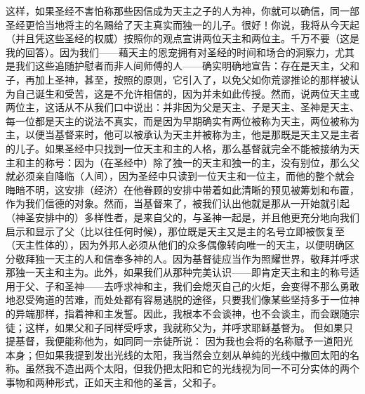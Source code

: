 这样，如果圣经不害怕称那些因信成为天主之子的人为神，你就可以确信，同一部圣经更恰当地将主的名赐给了天主真实而独一的儿子。很好！你说，我将从今天起（并且凭这些圣经的权威）按照你的观点宣讲两位天主和两位主。千万不要（这是我的回答）。因为我们——藉天主的恩宠拥有对圣经的时间和场合的洞察力，尤其是我们这些追随护慰者而非人间师傅的人——确实明确地宣告：存在是天主，父和子，再加上圣神，甚至，按照的原则，它引入了，以免父如你荒谬推论的那样被认为自己诞生和受苦，这是不允许相信的，因为并未如此传授。然而，说两位天主或两位主，这话从不从我们口中说出：并非因为父是天主、子是天主、圣神是天主、每一位都是天主的说法不真实，而是因为早期确实有两位被称为天主，两位被称为主，以便当基督来时，他可以被承认为天主并被称为主，他是那既是天主又是主者的儿子。如果圣经中只找到一位天主和主的人格，那么基督就完全不能被接纳为天主和主的称号：因为（在圣经中）除了独一的天主和独一的主，没有别位，那么父就必须亲自降临（人间），因为圣经中只读到一位天主和一位主，而他的整个就会晦暗不明，这安排（经济）在他眷顾的安排中带着如此清晰的预见被筹划和布置，作为我们信德的对象。然而，当基督来了，被我们认出他就是那从一开始就引起（神圣安排中的）多样性者，是来自父的，与圣神一起是，并且他更充分地向我们启示和显示了父（比以往任何时候），那位既是天主又是主的名号立即被恢复至（天主性体的），因为外邦人必须从他们的众多偶像转向唯一的天主，以便明确区分敬拜独一天主的人和信奉多神的人。因为基督徒应当作为照耀世界，敬拜并呼求那独一天主和主为。此外，如果我们从那种完美认识——即肯定天主和主的称号适用于父、子和圣神——去呼求神和主，我们会熄灭自己的火炬，会变得不那么勇敢地忍受殉道的苦难，而处处都有容易逃脱的途径，只要我们像某些坚持多于一位神的异端那样，指着神和主发誓。因此，我根本不会谈神，也不会谈主，而会跟随宗徒；这样，如果父和子同样受呼求，我就称父为，并呼求耶稣基督为。 但如果只提基督，我便能称他为，如同同一宗徒所说：  因为我也会将的名称赋予一道阳光本身；但如果我提到发出光线的太阳，我当然会立刻从单纯的光线中撤回太阳的名称。虽然我不造出两个太阳，但我仍把太阳和它的光线视为同一不可分实体的两个事物和两种形式，正如天主和他的圣言，父和子。\par


